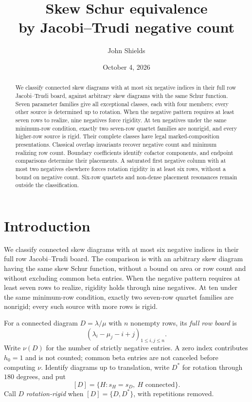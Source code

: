 \documentclass[11pt,a4paper]{amsart}
\title[Skew Schur equivalence by negative count]
{Skew Schur equivalence\\
by Jacobi--Trudi negative count}
\author{John Shields}
\date{October 4, 2026}
\numberwithin{equation}{section}
\theoremstyle{plain}
\theoremstyle{definition}
\begin{document}
\begin{abstract}
We classify connected skew diagrams with at most six negative indices in their full row Jacobi--Trudi board, against arbitrary skew diagrams with the same Schur function.  Seven parameter families give all exceptional classes, each with four members; every other source is determined up to rotation.  When the negative pattern requires at least seven rows to realize, nine negatives force rigidity.  At ten negatives under the same minimum-row condition, exactly two seven-row quartet families are nonrigid, and every higher-row source is rigid.  Their complete classes have legal marked-composition presentations.  Classical overlap invariants recover negative count and minimum realizing row count.  Boundary coefficients identify cofactor components, and endpoint comparisons determine their placements.  A saturated first negative column with at most two negatives elsewhere forces rotation rigidity in at least six rows, without a bound on negative count.  Six-row quartets and non-dense placement resonances remain outside the classification.
\end{abstract}

\maketitle

\section{Introduction}\label{sec:introduction}

We classify connected skew diagrams with at most six negative indices in
their full row Jacobi--Trudi board.  The comparison is with an arbitrary
skew diagram having the same skew Schur function, without a bound on area
or row count and without excluding common beta entries.  When the negative
pattern requires at least seven rows to realize, rigidity holds through
nine negatives.  At ten under the same minimum-row condition, exactly
two seven-row quartet families are nonrigid; every such source with more
rows is rigid.

For a connected diagram \(D=\lambda/\mu\) with \(n\) nonempty rows,
its \emph{full row board} is
\[
 (\lambda_i-\mu_j-i+j)_{1\le i,j\le n}.
\]
Write \(\nu(D)\) for the number of strictly negative entries.  A zero
index contributes \(h_0=1\) and is not counted; common beta entries are
not canceled before computing \(\nu\).  Identify diagrams up to
translation, write \(D^*\) for rotation through \(180\) degrees, and put
\[
 [D]=\{H:s_H=s_D,\ H\text{ connected}\}.
\]
Call \(D\) \emph{rotation-rigid} when
\([D]=\{D,D^*\}\), with repetitions removed.
\end{document}
